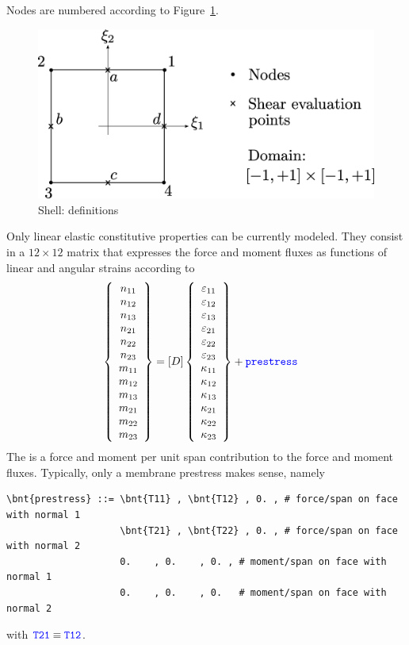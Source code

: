 Nodes are numbered according to Figure~\ref{fig:EL:PLATE:SHELL4:sketch}.
\begin{figure}
\centering
\includegraphics[width=.6\textwidth]{shellPic}
\caption{Shell: definitions}
\label{fig:EL:PLATE:SHELL4:sketch}
\end{figure}

Only linear elastic constitutive properties can be currently modeled.
They consist in a $12 \times 12$ matrix that expresses the force and moment
fluxes as functions of linear and angular strains according to
\begin{align}
	\left\{ \begin{array}{c} 
		n_{11} \\
		n_{12} \\
		n_{13} \\
		n_{21} \\
		n_{22} \\
		n_{23} \\
		m_{11} \\
		m_{12} \\
		m_{13} \\
		m_{21} \\
		m_{22} \\
		m_{23}
	 \end{array} \right\}
	&=
	\left[ D \right]
	\left\{ \begin{array}{c} 
		\varepsilon_{11} \\
		\varepsilon_{12} \\
		\varepsilon_{13} \\
		\varepsilon_{21} \\
		\varepsilon_{22} \\
		\varepsilon_{23} \\
		\kappa_{11} \\
		\kappa_{12} \\
		\kappa_{13} \\
		\kappa_{21} \\
		\kappa_{22} \\
		\kappa_{23}
	 \end{array} \right\}
	+
	\textcolor{blue}{\texttt{prestress}}
\end{align}
The  is a force and moment per unit span contribution
to the force and moment fluxes.
Typically, only a membrane prestress makes sense, namely
\begin{Verbatim}[commandchars=\\\{\}]
    \bnt{prestress} ::= \bnt{T11} , \bnt{T12} , 0. , # force/span on face with normal 1
                    \bnt{T21} , \bnt{T22} , 0. , # force/span on face with normal 2
                    0.    , 0.    , 0. , # moment/span on face with normal 1
                    0.    , 0.    , 0.   # moment/span on face with normal 2
\end{Verbatim}
with $\textcolor{blue}{\texttt{T21}} \equiv \textcolor{blue}{\texttt{T12}}$.


